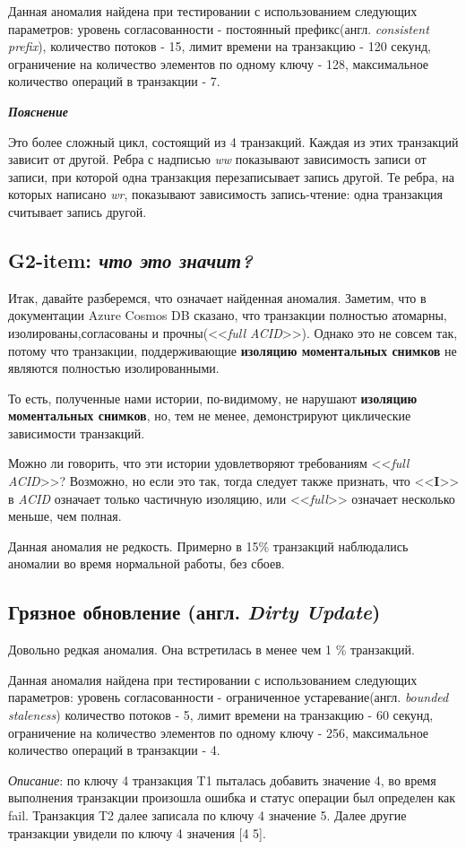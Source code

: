 \documentclass[12pt,  openany]{book}
\begin{document}
\par
Данная аномалия найдена при тестировании с использованием следующих параметров: уровень согласованности - постоянный префикс(англ.  \textit{consistent prefix}),  количество потоков - 15, лимит времени на транзакцию - 120 секунд, ограничение на количество элементов по одному ключу - 128, максимальное количество операций в транзакции - 7.

\textit{\textbf{Пояснение}}
\par
Это более сложный цикл, состоящий из 4 транзакций.  Каждая из этих транзакций зависит от другой. Ребра с надписью \textit{ww} показывают зависимость записи от записи, при которой одна транзакция перезаписывает запись другой. Те ребра, на которых написано \textit{wr}, показывают зависимость запись-чтение: одна транзакция считывает запись другой.

\subsection{G2-item: \textit{что это значит?}}
Итак, давайте разберемся, что означает найденная аномалия. Заметим, что в документации Azure Cosmos DB сказано, что транзакции полностью атомарны, изолированы,согласованы и прочны(<<\textit{full ACID}>>).  Однако это не совсем так, потому что транзакции, поддерживающие \textbf{изоляцию моментальных снимков} не являются полностью изолированными. 
\par
То есть, полученные нами истории, по-видимому, не нарушают \textbf{изоляцию моментальных снимков}, но, тем не менее, демонстрируют циклические зависимости транзакций.
\par
Можно ли говорить, что эти истории удовлетворяют требованиям <<\textit{full ACID}>>? Возможно, но если это так, тогда следует также признать, что <<\textbf{I}>> в \textit{ACID} означает только частичную изоляцию, или <<\textit{full}>> означает несколько меньше, чем полная.
\par
Данная аномалия не редкость. Примерно в 15\% транзакций наблюдались аномалии во время нормальной работы, без сбоев.

\subsection{Грязное обновление (англ. \textit{Dirty Update})}
Довольно редкая аномалия. Она встретилась в менее чем 1 \% транзакций.
\par
Данная аномалия найдена при тестировании с использованием следующих параметров: уровень согласованности - ограниченное устаревание(англ.  \textit{bounded staleness})  количество потоков - 5, лимит времени на транзакцию - 60 секунд, ограничение на количество элементов по одному ключу - 256, максимальное количество операций в транзакции - 4.
\par
\textit{Описание}: по ключу 4 транзакция T1 пыталась добавить значение 4, во время выполнения транзакции произошла ошибка и статус операции был определен как fail. Транзакция T2 далее записала по ключу 4 значение 5.  Далее другие транзакции увидели по ключу 4 значения [4 5].
\end{document}
